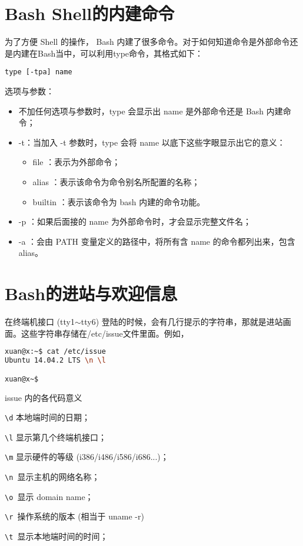 \section{Bash Shell的内建命令}
 为了方便 Shell 的操作， Bash 内建了很多命令。对于如何知道命令是外部命令还是内建在Bash当中，可以利用type命令，其格式如下：
 
 \verb|type [-tpa] name|

选项与参数：
\begin{itemize}
\item 不加任何选项与参数时，type 会显示出 name 是外部命令还是 Bash 内建命令；
\item -t：当加入 -t 参数时，type 会将 name 以底下这些字眼显示出它的意义：
	\begin{itemize}
	\item  file    ：表示为外部命令；
       \item alias   ：表示该命令为命令别名所配置的名称；
      \item builtin ：表示该命令为 bash 内建的命令功能。
	\end{itemize}
\item -p  ：如果后面接的 name 为外部命令时，才会显示完整文件名；
\item -a  ：会由 PATH 变量定义的路径中，将所有含 name 的命令都列出来，包含 alias。	
\end{itemize}



\section{Bash的进站与欢迎信息}
在终端机接口 (tty1$\sim$tty6) 登陆的时候，会有几行提示的字符串，那就是进站画面。这些字符串存储在/etc/issue文件里面。例如，
\begin{lstlisting}[language=sh]
xuan@x:~$ cat /etc/issue
Ubuntu 14.04.2 LTS \n \l

xuan@x~$ 
\end{lstlisting}

issue 内的各代码意义

\verb|\d| 本地端时间的日期；

\verb|\l| 显示第几个终端机接口；

\verb|\m| 显示硬件的等级 (i386/i486/i586/i686...)；

\verb|\n |显示主机的网络名称；

\verb|\o |显示 domain name；

\verb|\r |操作系统的版本 (相当于 uname -r)

\verb|\t |显示本地端时间的时间；

